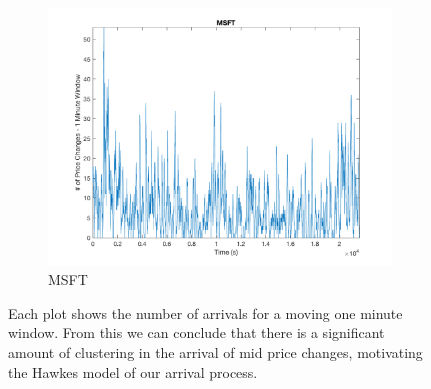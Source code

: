 \begin{figure}[htbp]
\vspace{3mm}

\begin{subfigure}[t]{0.49\textwidth}
\captionsetup{labelformat=empty}

\caption{MSFT}
\includegraphics[width=\textwidth, trim = 0 0 0 30, clip]{Cluster_Plots/MSFT_cluster.png}
\end{subfigure}

\caption{\label{fig:clustering} Each plot shows the number of arrivals for a moving one minute window. From this we can conclude that there is a significant amount of clustering in the arrival of mid price changes, motivating the Hawkes model of our arrival process.}
\end{figure}